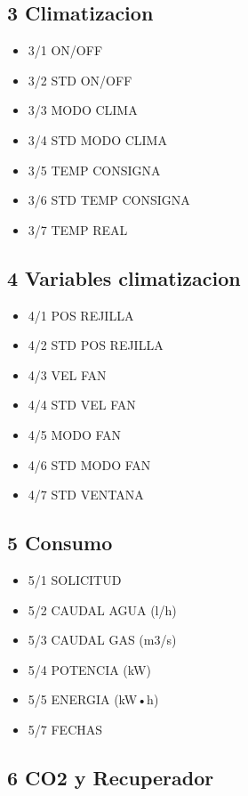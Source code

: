 \subsection{3 Climatizacion}

\begin{itemize}
\item{3/1 ON/OFF}
\item{3/2 STD ON/OFF}
\item{3/3 MODO CLIMA}
\item{3/4 STD MODO CLIMA}
\item{3/5 TEMP CONSIGNA}
\item{3/6 STD TEMP CONSIGNA}
\item{3/7 TEMP REAL}
\end{itemize} 

\subsection{4 Variables climatizacion}

\begin{itemize}
\item{4/1 POS REJILLA}
\item{4/2 STD POS REJILLA}
\item{4/3 VEL FAN}
\item{4/4 STD VEL FAN}
\item{4/5 MODO FAN}
\item{4/6 STD MODO FAN}
\item{4/7 STD VENTANA}
\end{itemize} 

\subsection{5 Consumo}

\begin{itemize}
\item{5/1 SOLICITUD}
\item{5/2 CAUDAL AGUA (l/h)}
\item{5/3 CAUDAL GAS (m3/s)}
\item{5/4 POTENCIA (kW)}
\item{5/5 ENERGIA (kW•h)}
\item{5/7 FECHAS}
\end{itemize} 

\subsection{6 CO2 y Recuperador}

